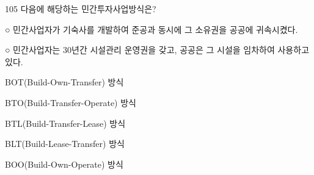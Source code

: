 \begin{question}{105}
다음에 해당하는 민간투자사업방식은?
\begin{framedtext}
○ 민간사업자가 기숙사를 개발하여 준공과 동시에 그 소유권을 공공에 귀속시켰다. \par
○ 민간사업자는 30년간 시설관리 운영권을 갖고, 공공은 그 시설을 임차하여 사용하고 있다. \par
\end{framedtext}
\begin{choices}
  \item BOT(Build-Own-Transfer) 방식
  \item BTO(Build-Transfer-Operate) 방식
  \item BTL(Build-Transfer-Lease) 방식
  \item BLT(Build-Lease-Transfer) 방식
  \item BOO(Build-Own-Operate) 방식
\end{choices}
\end{question}
